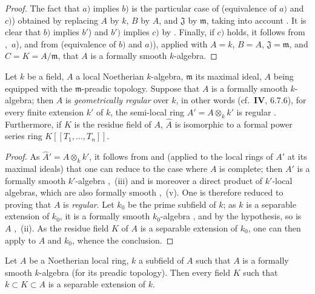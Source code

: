 \begin{proof}
The fact that $a)$ implies $b)$ is the particular case of  (equivalence of $a)$ and $c)$) obtained by replacing $A$ by $k$, $B$ by $A$, and $\mathfrak{J}$ by $\mathfrak{m}$, taking into account .
It is clear that $b)$ implies $b'$) and $b')$ implies $c)$ by .
Finally, if $c)$ holds, it follows from ,~$a$), and from  (equivalence of $b)$ and $a)$), applied with $A=k$, $B=A$, $\mathfrak{J}=\mathfrak{m}$, and $C=K=A/\mathfrak{m}$, that $A$ is a formally smooth $k$-algebra.
\end{proof}

\begin{corollary}[19.6.5]
\label{0.19.6.5}
Let $k$ be a field, $A$ a local Noetherian $k$-algebra, $\mathfrak{m}$ its maximal ideal, $A$ being equipped with the $\mathfrak{m}$-preadic topology.
Suppose that $A$ is a formally smooth $k$-algebra;
then $A$ is \emph{geometrically regular} over $k$, in other words (cf.~$\mathbf{IV}$, 6.7.6), for every finite extension $k'$ of $k$, the semi-local ring $A'=A\otimes_k k'$ is regular .
Furthermore, if $K$ is the residue field of $A$, $\widehat{A}$ is isomorphic to a formal power series ring $K[[T_1,\ldots,T_n]]$.
\end{corollary}

\begin{proof}
As $\widehat{A}'=\widehat{A}\otimes_k k'$, it follows from  and  (applied to the local rings of $A'$ at its maximal ideals) that one can reduce to the case where $A$ is complete;
then $A'$ is a formally smooth $k'$-algebra ,~(iii) and is moreover a direct product of $k'$-local algebras, which are also formally smooth ,~(v).
One is therefore reduced to proving that $A$ is \emph{regular}.
Let $k_0$ be the prime subfield of $k$;
as $k$ is a separable extension of $k_0$, it is a formally smooth $k_0$-algebra , and by the hypothesis, so is $A$ ,~(ii).
As the residue field $K$ of $A$ is a separable extension of $k_0$, one can then apply  to $A$ and $k_0$, whence the conclusion.
\end{proof}


\begin{corollary}[19.6.5.1]
\label{0.19.6.5.1}
Let $A$ be a Noetherian local ring, $k$ a subfield of $A$ such that $A$ is a formally smooth $k$-algebra (for its preadic topology).
Then every field $K$ such that $k\subset K\subset A$ is a separable extension of $k$.
\end{corollary}

